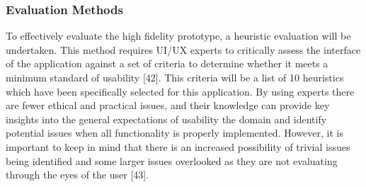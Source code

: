 \documentclass[a4 paper, 12pt]{article}
\begin{document}
    \subsubsection{Evaluation Methods}
    To effectively evaluate the high fidelity prototype, a heuristic evaluation will be undertaken. This method requires UI/UX experts to critically assess the interface of the application against a set of criteria to determine whether it meets a minimum standard of usability [42]. This criteria will be a list of 10 heuristics which have been specifically selected for this application. By using experts there are fewer ethical and practical issues, and their knowledge can provide key insights into the general expectations of usability the domain and identify potential issues when all functionality is properly implemented. However, it is important to keep in mind that there is an increased possibility of trivial issues being identified and some larger issues overlooked as they are not evaluating through the eyes of the user [43].    
\end{document}
